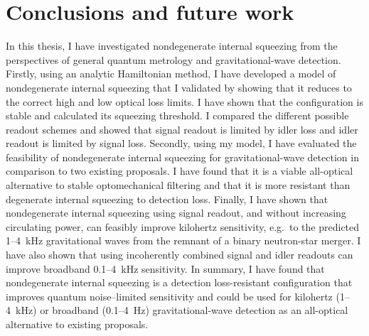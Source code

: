 \chapter{Conclusions and future work}
\label{chp:future_work_and_conclusions}

In this thesis, I have investigated nondegenerate internal squeezing from the perspectives of general quantum metrology	and gravitational-wave detection.
Firstly, using an analytic Hamiltonian method, I have developed a model of nondegenerate internal squeezing that I validated by showing that it reduces to the correct high and low optical loss limits. I have shown that the configuration is stable and calculated its squeezing threshold. I compared the different possible readout schemes and showed that signal readout is limited by idler loss and idler readout is limited by signal loss.
Secondly, using my model, I have evaluated the feasibility of nondegenerate internal squeezing for gravitational-wave detection in comparison to two existing proposals. I have found that it is a viable all-optical alternative to stable optomechanical filtering and that it is more resistant than degenerate internal squeezing to detection loss. %
Finally, I have shown that nondegenerate internal squeezing using signal readout, and without increasing circulating power, can feasibly improve kilohertz sensitivity, e.g.\ to the predicted 1--4~kHz gravitational waves from the remnant of a binary neutron-star merger. %
I have also shown that using incoherently combined signal and idler readouts can improve broadband 0.1--4~kHz sensitivity. %
In summary, I have found that nondegenerate internal squeezing is a detection loss-resistant configuration that improves quantum noise--limited sensitivity and could be used for kilohertz (1--4~kHz) or broadband (0.1--4~Hz) gravitational-wave detection as an all-optical alternative to existing proposals.

